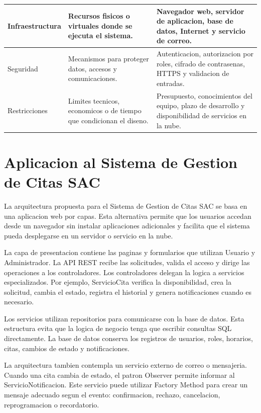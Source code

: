 \documentclass[12pt,letterpaper]{article}
\begin{document}
\begin{longtable}{|p{3.8cm}|p{4.8cm}|p{5.9cm}|}
Infraestructura & Recursos fisicos o virtuales donde se ejecuta el sistema. & Navegador web, servidor de aplicacion, base de datos, Internet y servicio de correo. \\
\hline

Seguridad & Mecanismos para proteger datos, accesos y comunicaciones. & Autenticacion, autorizacion por roles, cifrado de contrasenas, HTTPS y validacion de entradas. \\
\hline

Restricciones & Limites tecnicos, economicos o de tiempo que condicionan el diseno. & Presupuesto, conocimientos del equipo, plazo de desarrollo y disponibilidad de servicios en la nube. \\
\hline
\end{longtable}

\section{Aplicacion al Sistema de Gestion de Citas SAC}

La arquitectura propuesta para el Sistema de Gestion de Citas SAC se basa en una aplicacion web por capas. Esta alternativa permite que los usuarios accedan desde un navegador sin instalar aplicaciones adicionales y facilita que el sistema pueda desplegarse en un servidor o servicio en la nube.

La capa de presentacion contiene las paginas y formularios que utilizan Usuario y Administrador. La API REST recibe las solicitudes, valida el acceso y dirige las operaciones a los controladores. Los controladores delegan la logica a servicios especializados. Por ejemplo, ServicioCita verifica la disponibilidad, crea la solicitud, cambia el estado, registra el historial y genera notificaciones cuando es necesario.

Los servicios utilizan repositorios para comunicarse con la base de datos. Esta estructura evita que la logica de negocio tenga que escribir consultas SQL directamente. La base de datos conserva los registros de usuarios, roles, horarios, citas, cambios de estado y notificaciones.

La arquitectura tambien contempla un servicio externo de correo o mensajeria. Cuando una cita cambia de estado, el patron Observer permite informar al ServicioNotificacion. Este servicio puede utilizar Factory Method para crear un mensaje adecuado segun el evento: confirmacion, rechazo, cancelacion, reprogramacion o recordatorio.

\begin{center}
\end{center}
\end{document}
